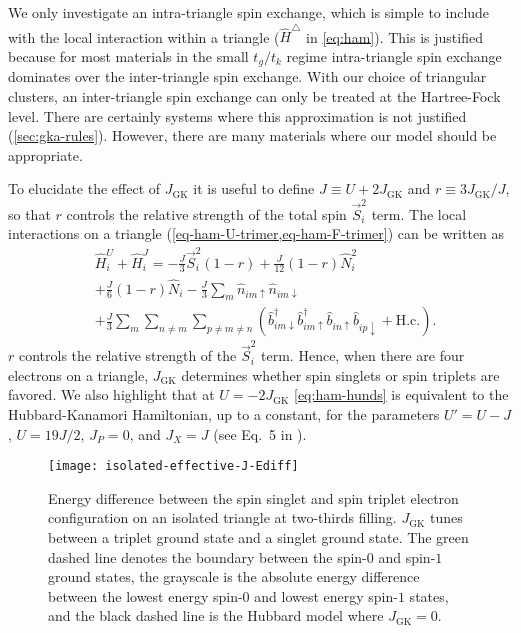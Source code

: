 \documentclass[reprint,aps,prb,amsmath,amssymb]{revtex4-2}
\begin{document}
We only investigate an intra-triangle spin exchange, which is simple to include with the local interaction within a triangle ($\hat{H}^{\triangle}$ in \cref{eq:ham}). This is justified because for most materials in the small $t_g/t_k$ regime intra-triangle spin exchange dominates over the inter-triangle spin exchange. With our choice of triangular clusters, an inter-triangle spin exchange can only be treated at the Hartree-Fock level. There are certainly systems where this approximation is not justified (\cref{sec:gka-rules}). However, there are many materials where our model should be appropriate.

To elucidate the effect of $J_{\mathrm{GK}}$ it is useful to define $J \equiv U + 2 J_{\mathrm{GK}}$ and $r \equiv 3 J_{\mathrm{GK}}/ J$, so that $r$ controls the relative strength of the total spin $\vec{S}_i^2$ term. The local interactions on a triangle (\cref{eq-ham-U-trimer,eq-ham-F-trimer}) can be written as
%
\begin{align} \label{eq:ham-hunds}
& \hat{H}_i^U  + \hat{H}_i^J  = - \frac{J}{3} \vec{S}_i^2(1 - r) + \frac{J}{12}(1 - r )  \hat{N}_i^2 \nonumber \\
%
&+ \frac{J}{6} \left( 1 - r \right) \hat{N}_i - \frac{J}{3} \sum_m \hat{n}_{im\uparrow} \hat{n}_{im\downarrow} \nonumber \\
%
& + \frac{J}{3} \sum_{m} \sum_{n \neq m} \sum_{p \neq m \neq n} \left( \hat{b}_{im \downarrow}^{\dagger} \hat{b}_{im \uparrow}^{\dagger} \hat{b}_{in \uparrow}^{} \hat{b}_{ip \downarrow}^{} + \mathrm{H.c.} \right).
\end{align}
%
$r$ controls the relative strength of the $\vec{S}_i^2$ term. Hence, when there are four electrons on a triangle, $J_{\mathrm{GK}}$ determines whether spin singlets or spin triplets are favored. We also highlight that at $U = - 2 J_{\mathrm{GK}}$ \cref{eq:ham-hunds} is equivalent to the Hubbard-Kanamori Hamiltonian, up to a constant, for the parameters $U' = U - J$, $U = 19 J / 2$, $J_P = 0$, and $J_X = J$ (see Eq.~5 in \cite{Georges2013}).

\begin{figure}
	\centering
	\texttt{[image: isolated-effective-J-Ediff]} %
	\caption{\label{fig:isolated-effective-J}
		Energy difference between the spin singlet and spin triplet electron configuration on an isolated triangle at two-thirds filling. $J_{\mathrm{GK}}$ tunes between a triplet ground state and a singlet ground state. The green dashed line denotes the boundary between the spin-$0$ and spin-$1$ ground states, the grayscale is the absolute energy difference between the lowest energy spin-$0$ and lowest energy spin-$1$ states, and the black dashed line is the Hubbard model where $J_{\mathrm{GK}} = 0$.
	}
\end{figure}
\end{document}
